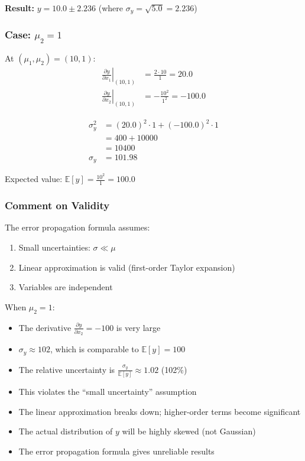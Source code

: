 \documentclass[12pt]{article}
\begin{document}
\textbf{Result:} $y = 10.0 \pm 2.236$ (where $\sigma_y = \sqrt{5.0} = 2.236$)

\subsubsection*{Case: $\mu_2 = 1$}
At $(\mu_1, \mu_2) = (10, 1)$:
\begin{align}
\left. \frac{\partial y}{\partial x_1} \right|_{(10,1)} &= \frac{2 \cdot 10}{1} = 20.0 \\
\left. \frac{\partial y}{\partial x_2} \right|_{(10,1)} &= -\frac{10^2}{1^2} = -100.0
\end{align}

\begin{align}
\sigma_y^2 &= (20.0)^2 \cdot 1 + (-100.0)^2 \cdot 1 \\
&= 400 + 10000 \\
&= 10400 \\
\sigma_y &= 101.98
\end{align}

Expected value: $\mathbb{E}[y] = \frac{10^2}{1} = 100.0$

\subsubsection*{Comment on Validity}
The error propagation formula assumes:
\begin{enumerate}
    \item Small uncertainties: $\sigma \ll \mu$
    \item Linear approximation is valid (first-order Taylor expansion)
    \item Variables are independent
\end{enumerate}

When $\mu_2 = 1$:
\begin{itemize}
    \item The derivative $\frac{\partial y}{\partial x_2} = -100$ is very large
    \item $\sigma_y \approx 102$, which is comparable to $\mathbb{E}[y] = 100$
    \item The relative uncertainty is $\frac{\sigma_y}{\mathbb{E}[y]} \approx 1.02$ (102\%)
    \item This violates the ``small uncertainty'' assumption
    \item The linear approximation breaks down; higher-order terms become significant
    \item The actual distribution of $y$ will be highly skewed (not Gaussian)
    \item The error propagation formula gives unreliable results
\end{itemize}
\end{document}
